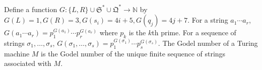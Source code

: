 Define a function $G: \{L, R\} \cup \mathfrak{S}^* \cup \mathfrak{Q}^* \to \mathbb{N}$ by $G(L) = 1, G(R) = 3, G(s_i) = 4i + 5, G(q_j) = 4j + 7$. For a string $a_1 \cdots a_r$, $G(a_1 \cdots a_r) = p_1^{G(a_1)} \cdots p_r^{G(a_r)}$ where $p_k$ is the $k$th prime. For a sequence of strings $\sigma_1, \ldots, \sigma_s$, $G(\sigma_1, \ldots, \sigma_s) = p_1^{G(\sigma_1)} \cdots p_s^{G(\sigma_s)}$. The Godel number of a Turing machine $M$ is the Godel number of the unique finite sequence of strings associated with $M$.
